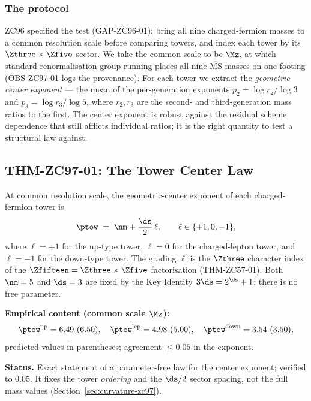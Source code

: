 \documentclass[12pt, a4paper]{article}
\begin{document}
\subsubsection{The protocol}

ZC96 specified the test (GAP-ZC96-01): bring all nine charged-fermion masses to
a common resolution scale before comparing towers, and index each tower by its
$\Zthree\times\Zfive$ sector. We take the common scale to be $\Mz$, at which
standard renormalisation-group running places all nine $\overline{\mathrm{MS}}$
masses on one footing (OBS-ZC97-01 logs the provenance). For each tower we
extract the \emph{geometric-center exponent} --- the mean of the per-generation
exponents $p_2=\log r_2/\log 3$ and $p_3=\log r_3/\log 5$, where $r_2,r_3$ are
the second- and third-generation mass ratios to the first. The center exponent
is robust against the residual scheme dependence that still afflicts individual
ratios; it is the right quantity to test a structural law against.

\subsection{THM-ZC97-01: The Tower Center Law}
\label{sec:centerlaw-zc97}

\begin{formalbox}[title={THM-ZC97-01: Tower Center Law (parameter-free)}]
At common resolution scale, the geometric-center exponent of each charged-fermion
tower is
\[
  \ptow \;=\; \nm + \frac{\ds}{2}\,\ell,
  \qquad \ell\in\{+1,0,-1\},
\]
where $\ell=+1$ for the up-type tower, $\ell=0$ for the charged-lepton tower,
and $\ell=-1$ for the down-type tower. The grading $\ell$ is the $\Zthree$
character index of the $\Zfifteen=\Zthree\times\Zfive$ factorisation
(THM-ZC57-01). Both $\nm=5$ and $\ds=3$ are fixed by the Key Identity
$3\ds=2^{\ds}+1$; there is no free parameter.

\textbf{Empirical content (common scale $\Mz$):}
\[
  \ptow^{\mathrm{up}} = 6.49\ (6.50),\quad
  \ptow^{\mathrm{lep}} = 4.98\ (5.00),\quad
  \ptow^{\mathrm{down}} = 3.54\ (3.50),
\]
predicted values in parentheses; agreement $\le 0.05$ in the exponent.

\textbf{Status.} Exact statement of a parameter-free law for the center
exponent; verified to $0.05$. It fixes the tower \emph{ordering} and the
$\ds/2$ sector spacing, not the full mass values (Section~\ref{sec:curvature-zc97}).
\end{formalbox}
\end{document}
